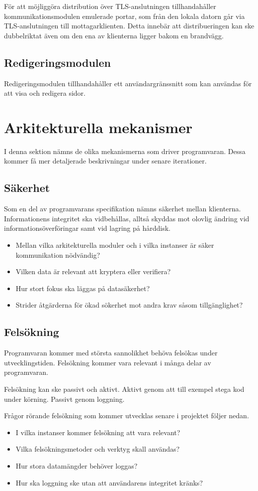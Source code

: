 För att möjliggöra distribution över TLS-anslutningen tillhandahåller kommunikationsmodulen emulerade portar, som från den lokala datorn går via TLS-anslutningen till mottagarklienten. Detta innebär att distribueringen kan ske dubbelriktat även om den ena av klienterna ligger bakom en brandvägg.


\subsection{Redigeringsmodulen}
Redigeringsmodulen tillhandahåller ett användargränssnitt som kan användas för att visa och redigera sidor. 
\section{Arkitekturella mekanismer}
I denna sektion nämns de olika mekanismerna som driver programvaran. Dessa kommer få mer detaljerade beskrivningar under senare iterationer.
\subsection{Säkerhet}
Som en del av programvarans specifikation nämns säkerhet mellan klienterna. Informationens integritet ska vidbehållas, alltså skyddas mot olovlig ändring vid informationsöverföringar samt vid lagring på hårddisk.

\begin{itemize}
\item Mellan vilka arkitekturella moduler och i vilka instanser är säker kommunikation nödvändig?
\item Vilken data är relevant att kryptera eller verifiera?
\item Hur stort fokus ska läggas på datasäkerhet?
\item Strider åtgärderna för ökad sökerhet mot andra krav såsom tillgänglighet?
\end{itemize}
\subsection{Felsökning}
Programvaran kommer med största sannolikhet behöva felsökas under utvecklingstiden. Felsökning kommer vara relevant i många delar av programvaran.

Felsökning kan ske passivt och aktivt. Aktivt genom att till exempel stega kod under körning. Passivt genom loggning.

Frågor rörande felsökning som kommer utvecklas senare i projektet följer nedan.
\begin{itemize}
\item I vilka instanser kommer felsökning att vara relevant?
\item Vilka felsökningsmetoder och verktyg skall användas?
\item Hur stora datamängder behöver loggas?
\item Hur ska loggning ske utan att användarens integritet kränks?
\end{itemize}
